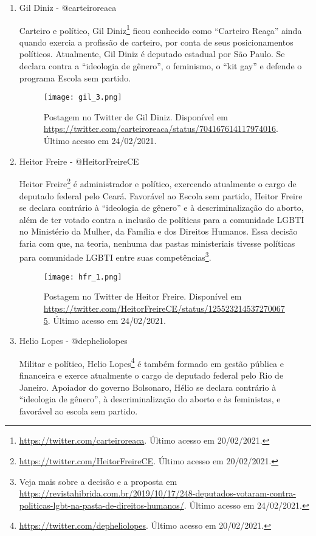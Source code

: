 \documentclass[
	12pt,				%
	openright,			%
	twoside,			%
	a4paper,			%
	english,			%
	brazil				%
	]{abntex2}
\begin{document}
\begin{anexosenv}
\begin{enumerate}
  \newpage
  
 \item Gil Diniz - @carteiroreaca
 
 Carteiro e político, Gil Diniz\footnote{\url{https://twitter.com/carteiroreaca}. Último acesso em 20/02/2021.} ficou conhecido como ``Carteiro Reaça'' ainda quando exercia a profissão de carteiro, por conta de seus posicionamentos políticos. Atualmente, Gil Diniz é deputado estadual por São Paulo. Se declara contra a ``ideologia de gênero'', o feminismo, o ``kit gay'' e defende o programa Escola sem partido.
 
 \begin{figure}[!htbp]
    \centering
    \texttt{[image: gil\_3.png]}
    \caption{Postagem no Twitter de Gil Diniz. Disponível em \url{https://twitter.com/carteiroreaca/status/704167614117974016}. Último acesso em 24/02/2021.}
 \end{figure}
  
 \item Heitor Freire - @HeitorFreireCE
 
 Heitor Freire\footnote{\url{https://twitter.com/HeitorFreireCE}. Último acesso em 20/02/2021.} é administrador e político, exercendo atualmente o cargo de deputado federal pelo Ceará. Favorável ao Escola sem partido, Heitor Freire se declara contrário à ``ideologia de gênero'' e à descriminalização do aborto, além de ter votado contra a inclusão de políticas para a comunidade LGBTI no Ministério da Mulher, da Família e dos Direitos Humanos. Essa decisão faria com que, na teoria, nenhuma das pastas ministeriais tivesse políticas para comunidade LGBTI entre suas competências\footnote{Veja mais sobre a decisão e a proposta em \url{https://revistahibrida.com.br/2019/10/17/248-deputados-votaram-contra-politicas-lgbt-na-pasta-de-direitos-humanos/}. Último acesso em 24/02/2021.}.
 
 \begin{figure}[!htbp]
    \centering
    \texttt{[image: hfr\_1.png]}
    \caption{Postagem no Twitter de Heitor Freire. Disponível em \url{https://twitter.com/HeitorFreireCE/status/1255232145372700675}. Último acesso em 24/02/2021.}
 \end{figure}
 
 \item Helio Lopes - @depheliolopes
 
 Militar e político, Helio Lopes\footnote{\url{https://twitter.com/depheliolopes}. Último acesso em 20/02/2021.} é também formado em gestão pública e financeira e exerce atualmente o cargo de deputado federal pelo Rio de Janeiro. Apoiador do governo Bolsonaro, Hélio se declara contrário à ``ideologia de gênero'', à descriminalização do aborto e às feministas, e favorável ao escola sem partido.
 

\end{enumerate}
\end{anexosenv}
\end{document}
